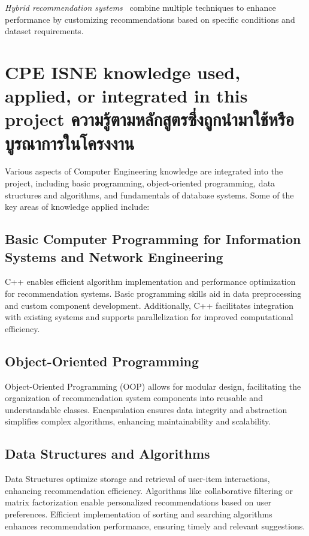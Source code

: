 \textit{Hybrid recommendation systems}~\cite{5628917} combine multiple techniques to enhance performance 
by customizing recommendations based on specific conditions and dataset requirements.

\section{\ifenglish%
\ifcpe CPE \else ISNE \fi knowledge used, applied, or integrated in this project
\else%
ความรู้ตามหลักสูตรซึ่งถูกนำมาใช้หรือบูรณาการในโครงงาน
\fi
}

Various aspects of Computer Engineering knowledge are integrated into the project, including basic programming, object-oriented programming, data structures and algorithms, and fundamentals of database systems.
Some of the key areas of knowledge applied include:

\subsection{Basic Computer Programming for Information Systems and Network Engineering}

C++ enables efficient algorithm implementation and performance optimization for 
recommendation systems. Basic programming skills aid in data preprocessing and custom 
component development. Additionally, C++ facilitates integration with existing systems 
and supports parallelization for improved computational efficiency.

\subsection{Object-Oriented Programming}

Object-Oriented Programming (OOP) allows for modular design, facilitating the organization 
of recommendation system components into reusable and understandable classes. 
Encapsulation ensures data integrity and abstraction simplifies complex algorithms, 
enhancing maintainability and scalability.

\subsection{Data Structures and Algorithms}

Data Structures optimize storage and retrieval of user-item interactions, enhancing 
recommendation efficiency. Algorithms like collaborative filtering or matrix factorization 
enable personalized recommendations based on user preferences. Efficient implementation of 
sorting and searching algorithms enhances recommendation performance, ensuring timely and 
relevant suggestions.

